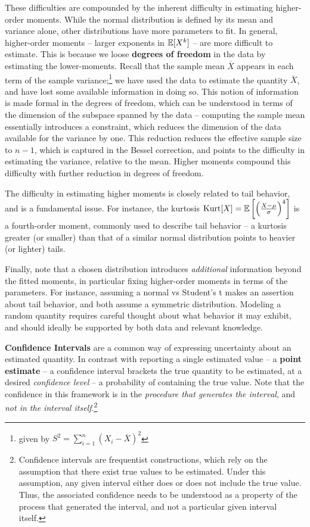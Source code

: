 \documentclass[../primer.tex]{subfiles}
\begin{document}
These difficulties are compounded by the inherent difficulty in estimating
higher-order moments. While the normal distribution is defined by its mean and
variance alone, other distributions have more parameters to fit. In general,
higher-order moments -- larger exponents in $\mathbb{E}[X^k]$ -- are more difficult to
estimate. This is because we loose \textbf{degrees of freedom} in the data by
estimating the lower-moments. Recall that the sample mean $\overline{X}$ appears
in each term of the sample variance;\footnote{given by $S^2 = \sum_{i=1}^n (X_i
  - \overline{X})^2$} we have used the data to estimate the quantity
$\overline{X}$, and have lost some available information in doing so. This
notion of information is made formal in the degrees of freedom, which can be
understood in terms of the dimension of the subspace spanned by the data --
computing the sample mean essentially introduces a constraint, which reduces the
dimension of the data available for the variance by one. This reduction reduces
the effective sample size to $n-1$, which is captured in the Bessel correction,
and points to the difficulty in estimating the variance, relative to the mean.
Higher moments compound this difficulty with further reduction in degrees of
freedom.

The difficulty in estimating higher moments is closely related to tail behavior,
and is a fundamental issue. For instance, the kurtosis $\text{Kurt}[X] =
\mathbb{E}\left[\left(\frac{X - \mu}{\sigma}\right)^4\right]$ is a fourth-order moment,
commonly used to describe tail behavior -- a kurtosis greater (or smaller) than
that of a similar normal distribution points to heavier (or lighter) tails.

Finally, note that a chosen distribution introduces \emph{additional}
information beyond the fitted moments, in particular fixing higher-order moments
in terms of the parameters. For instance, assuming a normal vs Student's t makes
an assertion about tail behavior, and both assume a symmetric distribution.
Modeling a random quantity requires careful thought about what behavior it may
exhibit, and should ideally be supported by both data and relevant knowledge.

\textbf{Confidence Intervals} are a common way of expressing uncertainty about
an estimated quantity. In contrast with reporting a single estimated value -- a
\textbf{point estimate} -- a confidence interval brackets the true quantity to
be estimated, at a desired \emph{confidence level} -- a probability of
containing the true value. Note that the confidence in this framework is in the
\emph{procedure that generates the interval}, and \emph{not in the interval
  itself}.\footnote{Confidence intervals are frequentist constructions, which
  rely on the assumption that there exist true values to be estimated. Under
  this assumption, any given interval either does or does not include the true
  value. Thus, the associated confidence needs to be understood as a property of
  the process that generated the interval, and not a particular given interval
  itself.}
\end{document}
